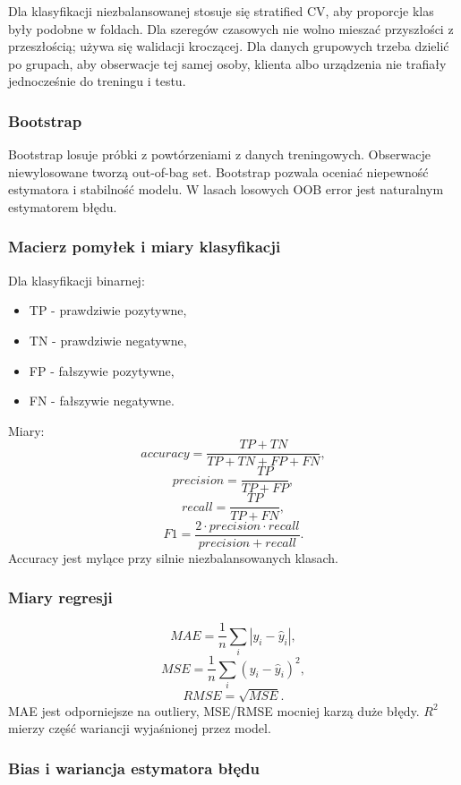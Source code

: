Dla klasyfikacji niezbalansowanej stosuje się stratified CV, aby proporcje klas były podobne w foldach. Dla szeregów czasowych nie wolno mieszać przyszłości z przeszłością; używa się walidacji kroczącej. Dla danych grupowych trzeba dzielić po grupach, aby obserwacje tej samej osoby, klienta albo urządzenia nie trafiały jednocześnie do treningu i testu.

\subsubsection{Bootstrap}

Bootstrap losuje próbki z powtórzeniami z danych treningowych. Obserwacje niewylosowane tworzą out-of-bag set. Bootstrap pozwala oceniać niepewność estymatora i stabilność modelu. W lasach losowych OOB error jest naturalnym estymatorem błędu.

\subsubsection{Macierz pomyłek i miary klasyfikacji}

Dla klasyfikacji binarnej:
\begin{itemize}
  \item TP - prawdziwie pozytywne,
  \item TN - prawdziwie negatywne,
  \item FP - fałszywie pozytywne,
  \item FN - fałszywie negatywne.
\end{itemize}

Miary:
\[
accuracy=\frac{TP+TN}{TP+TN+FP+FN},
\]
\[
precision=\frac{TP}{TP+FP},
\]
\[
recall=\frac{TP}{TP+FN},
\]
\[
F1=\frac{2\cdot precision\cdot recall}{precision+recall}.
\]
Accuracy jest mylące przy silnie niezbalansowanych klasach.

\subsubsection{Miary regresji}

\[
MAE=\frac{1}{n}\sum_i |y_i-\hat y_i|,
\]
\[
MSE=\frac{1}{n}\sum_i (y_i-\hat y_i)^2,
\]
\[
RMSE=\sqrt{MSE}.
\]
MAE jest odporniejsze na outliery, MSE/RMSE mocniej karzą duże błędy. $R^2$ mierzy część wariancji wyjaśnionej przez model.

\subsubsection{Bias i wariancja estymatora błędu}

